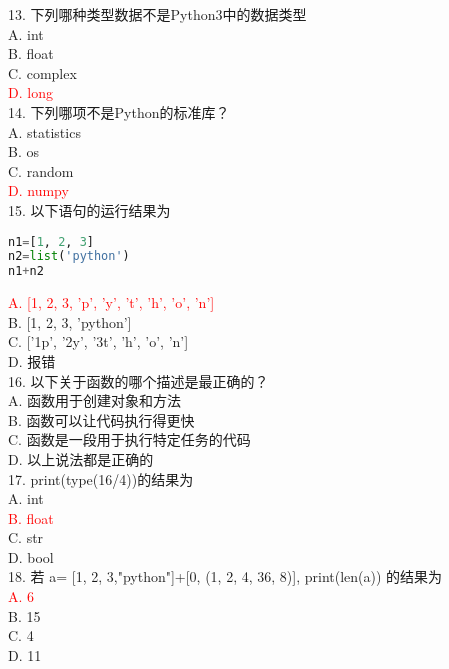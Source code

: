 \documentclass[6pt]{article}
\begin{document}
13. 下列哪种类型数据不是Python3中的数据类型\\

A. int\\
B. float\\
C. complex\\
\textcolor{red}{D. long}\\

14. 下列哪项不是Python的标准库？\\

A. statistics\\
B. os\\
C. random\\
\textcolor{red}{D. numpy}\\


15. 以下语句的运行结果为\\

\begin{lstlisting}[language=Python]
n1=[1, 2, 3]
n2=list('python')
n1+n2
\end{lstlisting}
\textcolor{red}{A. [1, 2, 3, 'p', 'y', 't', 'h', 'o', 'n']}\\
B. [1, 2, 3, ’python’]\\
C. ['1p', '2y', '3t', 'h', 'o', 'n']\\
D. 报错\\

16. 以下关于函数的哪个描述是最正确的？\\

A. 函数用于创建对象和方法\\
B. 函数可以让代码执行得更快\\
C. 函数是一段用于执行特定任务的代码\\
D. 以上说法都是正确的\\

17. print(type(16/4))的结果为\\

A. int\\
	\textcolor{red}{B. float}\\
C. str\\
D. bool\\

18.  若 a= [1, 2, 3,"python"]+[0, (1, 2, 4, 36, 8)], print(len(a)) 的结果为\\

\textcolor{red}{A. 6}\\
B. 15\\
C. 4\\
D. 11\\
\end{document}
